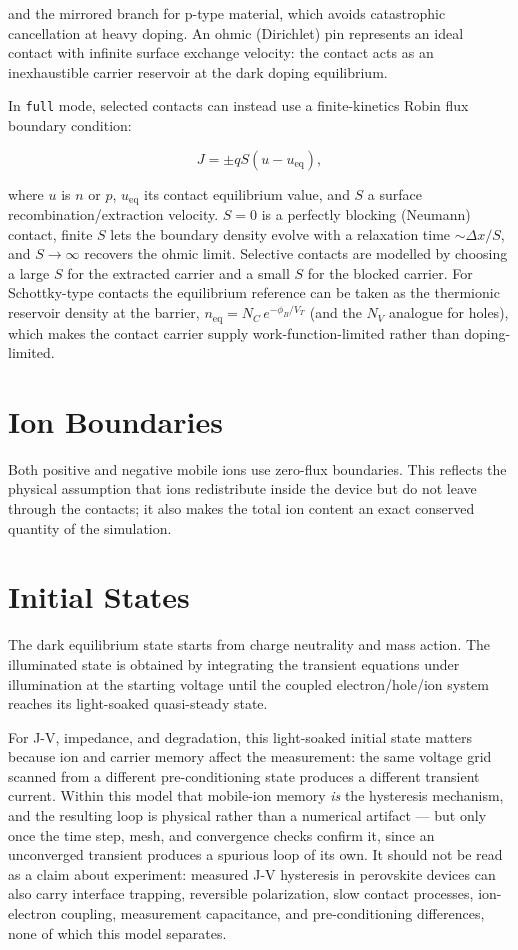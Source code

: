 \documentclass[
  11pt,
  american,
]{report}
\begin{document}
and the mirrored branch for p-type material, which avoids catastrophic
cancellation at heavy doping. An ohmic (Dirichlet) pin represents an
ideal contact with infinite surface exchange velocity: the contact acts
as an inexhaustible carrier reservoir at the dark doping equilibrium.

In \texttt{full} mode, selected contacts can instead use a
finite-kinetics Robin flux boundary condition:

\[
J=\pm qS(u-u_\mathrm{eq}),
\]

where \(u\) is \(n\) or \(p\), \(u_\mathrm{eq}\) its contact equilibrium
value, and \(S\) a surface recombination/extraction velocity. \(S=0\) is
a perfectly blocking (Neumann) contact, finite \(S\) lets the boundary
density evolve with a relaxation time \(\sim \Delta x/S\), and
\(S\to\infty\) recovers the ohmic limit. Selective contacts are modelled
by choosing a large \(S\) for the extracted carrier and a small \(S\)
for the blocked carrier. For Schottky-type contacts the equilibrium
reference can be taken as the thermionic reservoir density at the
barrier, \(n_\mathrm{eq} = N_C\, e^{-\phi_B/V_T}\) (and the \(N_V\)
analogue for holes), which makes the contact carrier supply
work-function-limited rather than doping-limited.

\hypertarget{ion-boundaries}{%
\section{Ion Boundaries}\label{ion-boundaries}}

Both positive and negative mobile ions use zero-flux boundaries. This
reflects the physical assumption that ions redistribute inside the
device but do not leave through the contacts; it also makes the total
ion content an exact conserved quantity of the simulation.

\hypertarget{initial-states}{%
\section{Initial States}\label{initial-states}}

The dark equilibrium state starts from charge neutrality and mass
action. The illuminated state is obtained by integrating the transient
equations under illumination at the starting voltage until the coupled
electron/hole/ion system reaches its light-soaked quasi-steady state.

For J-V, impedance, and degradation, this light-soaked initial state
matters because ion and carrier memory affect the measurement: the same
voltage grid scanned from a different pre-conditioning state produces a
different transient current. Within this model that mobile-ion memory
\emph{is} the hysteresis mechanism, and the resulting loop is physical
rather than a numerical artifact --- but only once the time step, mesh,
and convergence checks confirm it, since an unconverged transient
produces a spurious loop of its own. It should not be read as a claim
about experiment: measured J-V hysteresis in perovskite devices can also
carry interface trapping, reversible polarization, slow contact
processes, ion-electron coupling, measurement capacitance, and
pre-conditioning differences, none of which this model separates.
\end{document}
